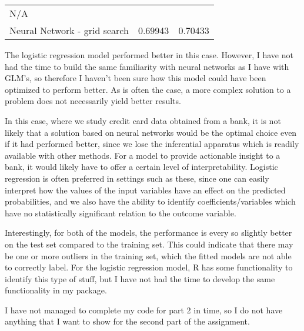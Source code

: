 \documentclass[]{article}
\begin{document}
\begin{longtable}[]{@{}lll@{}}
\begin{minipage}[t]{0.25\columnwidth}
N/A\strut
\end{minipage}\tabularnewline
\begin{minipage}[t]{0.42\columnwidth}\raggedright\strut
Neural Network - grid search\strut
\end{minipage} & \begin{minipage}[t]{0.24\columnwidth}\raggedright\strut
0.69943\strut
\end{minipage} & \begin{minipage}[t]{0.25\columnwidth}\raggedright\strut
0.70433\strut
\end{minipage}\tabularnewline
\bottomrule
\end{longtable}

The logistic regression model performed better in this case. However, I
have not had the time to build the same familiarity with neural networks
as I have with GLM's, so therefore I haven't been sure how this model
could have been optimized to perform better. As is often the case, a
more complex solution to a problem does not necessarily yield better
results.

In this case, where we study credit card data obtained from a bank, it
is not likely that a solution based on neural networks would be the
optimal choice even if it had performed better, since we lose the
inferential apparatus which is readily available with other methods. For
a model to provide actionable insight to a bank, it would likely have to
offer a certain level of interpretability. Logistic regression is often
preferred in settings such as these, since one can easily interpret how
the values of the input variables have an effect on the predicted
probabilities, and we also have the ability to identify
coefficients/variables which have no statistically significant relation
to the outcome variable.

Interestingly, for both of the models, the performance is every so
slightly better on the test set compared to the training set. This could
indicate that there may be one or more outliers in the training set,
which the fitted models are not able to correctly label. For the
logistic regression model, R has some functionality to identify this
type of stuff, but I have not had the time to develop the same
functionality in my package.

I have not managed to complete my code for part 2 in time, so I do not
have anything that I want to show for the second part of the assignment.
\end{document}
